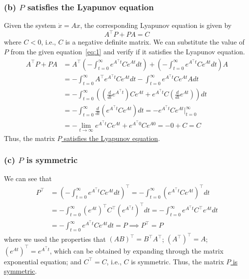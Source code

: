 \subsubsection*{(b) \( P \) satisfies the Lyapunov equation}

Given the system \( \dot x = A x \), the corresponding Lyapunov equation is given by
\begin{equation*}
    A^{\top} P + P A = C
\end{equation*}
where \( C < 0 \), i.e., \( C \) is a negative definite matrix.
We can substitute the value of \( P \) from the given equation~\eqref{eq:1} and verify if it satisfies the Lyapunov equation.
\begin{align*}
    A^\top P + P A
     & =
    A^\top \left( -\int_{t=0}^{\infty} e^{A^{\top} t} C e^{A t} d t \right) + \left( -\int_{t=0}^{\infty} e^{A^{\top} t} C e^{A t} d t \right) A
    \\ & =
    -\int_{t=0}^{\infty} A^\top e^{A^{\top} t} C e^{A t} d t - \int_{t=0}^{\infty} e^{A^{\top} t} C e^{A t} A d t
    \\ & =
    -\int_{t=0}^{\infty} \left( \left( \frac{d}{dt} e^{A^{\top} t} \right) C e^{A t} + e^{A^{\top} t} C \left( \frac{d}{dt} e^{A t} \right) \right) d t
    \\ & =
    -\int_{t=0}^{\infty} \frac{d}{dt} \left( e^{A^{\top} t} C e^{A t} \right) d t
    =
    - e^{A^{\top} t} C e^{A t} \Big|_{t=0}^{\infty}
    \\ & =
    - \lim_{t \to \infty} e^{A^{\top} t} C e^{A t} + e^{A^{\top} 0} C e^{A 0}
    =
    - 0 + C
    =
    C
\end{align*}
Thus, the matrix \underline{\( P \) satisfies the Lyapunov equation}.

\subsubsection*{(c) \( P \) is symmetric}

We can see that
\begin{align*}
    P^\top
     & =
    {\left( -\int_{t=0}^{\infty} e^{A^{\top} t} C e^{A t} d t \right)}^\top
    =
    -\int_{t=0}^{\infty} {\left( e^{A^{\top} t} C e^{A t} \right)}^\top d t
    \\ & =
    -\int_{t=0}^{\infty} {\left( e^{A t} \right)}^\top C^\top {\left( e^{A^{\top} t} \right)}^\top d t
    =
    -\int_{t=0}^{\infty} e^{A^\top t} C^\top e^{A t} d t
    \\ & =
    - \int_{t=0}^{\infty} e^{A^\top t} C e^{A t} d t
    =
    P
    \implies
    \boxed{
        P^\top = P
    }
\end{align*}
where we used the properties that \( {(AB)}^\top = B^\top A^\top \); \( {(A^\top)}^\top = A \); \( {(e^{A t})}^\top = e^{A^\top t} \), which can be obtained by expanding through the matrix exponential equation; and \( C^\top = C \), i.e., \( C \) is symmetric.
Thus, the matrix \underline{\( P \) is symmetric}.
